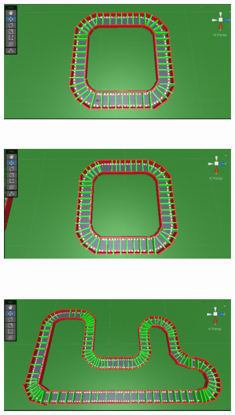 \documentclass[12pt]{article}
\begin{document}
\begin{center}
    \centering 
    \includegraphics[height=7cm, width=12cm]{images/track1Walls}
\end{center}
\vspace{0.5cm}
\begin{center}
    \centering 
    \includegraphics[height=7cm, width=12cm]{images/track2Walls}
\end{center}
\begin{center}
    \centering 
    \includegraphics[height=8cm, width=12cm]{images/track3Walls}
\end{center}
\end{document}
